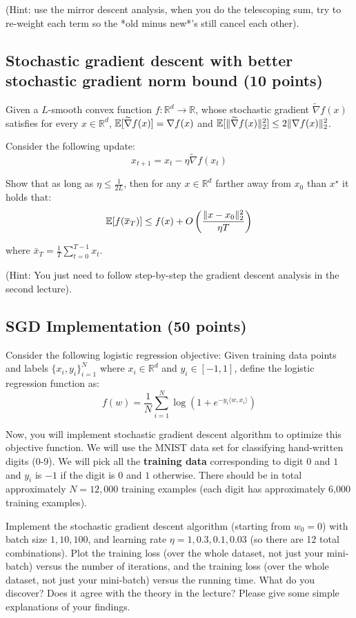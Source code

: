 (Hint: use the mirror descent analysis, when you do the telescoping sum, try to re-weight each term so the *old minus new*'s still cancel each other). 


\subsection{Stochastic gradient descent with better stochastic gradient norm bound (10 points)}


Given a $L$-smooth convex function $f : \mathbb{R}^d \to \mathbb{R}$, whose stochastic gradient $\tilde{\nabla}f(x)$ satisfies for every $x \in \mathbb{R}^d$, $\E[\tilde{\nabla}f(x)] = \nabla f(x)$ and $\E [\| \tilde{\nabla}f(x) \|_2^2] \leq 2 \| \nabla f(x) \|_2^2$.

Consider the following update:
$$x_{t + 1} = x_t - \eta \tilde{\nabla}f(x_t)$$


Show that as long as $\eta \leq \frac{1}{2L}$, then for any \(x \in \mathbb{R}^{d}\) farther away from \(x_{0}\) than \(x^{\star}\) it holds that:
$$\E[f(\bar{x}_T)] \leq f(x) + O\left(  \frac{\| x - x_0 \|_2^2}{\eta   T} \right)$$

where \(\displaystyle \bar{x}_{T} = \frac{1}{T} \sum_{t=0}^{T-1}x_{t}\).

(Hint: You just need to follow step-by-step the gradient descent analysis in the second lecture).


\subsection{SGD Implementation (50 points)}\label{sgd_problem}
Consider the following logistic regression objective: Given training data points and labels $\{x_i, y_i \}_{i = 1}^N$ where $x_i \in \mathbb{R}^d$ and $y_i \in [-1, 1]$, define the logistic regression function as:
$$f(w) = \frac{1}{N} \sum_{i = 1}^N \log \left( 1 + e^{- y_i \langle w, x_i \rangle} \right)$$



Now, you will implement stochastic gradient descent algorithm to optimize this objective function. We will use the MNIST data set for classifying hand-written digits (0-9). We will pick all the  \textbf{training data} corresponding to digit $0$ and $1$ and $y_i$ is $-1$ if the digit is $0$ and $1$ otherwise. There should be in total approximately $N = 12,000$ training examples (each digit has approximately 6,000 training examples). 

Implement the stochastic gradient descent algorithm (starting from $w_0 = 0$) with batch size $1, 10, 100$, and learning rate $\eta = 1, 0.3, 0.1, 0.03$ (so there are 12 total combinations). Plot the training loss (over the whole dataset, not just your mini-batch) versus the number of iterations, and the training loss (over the whole dataset, not just your mini-batch) versus the running time. What do you discover? Does it agree with the theory in the lecture? Please give some simple explanations of your findings.

